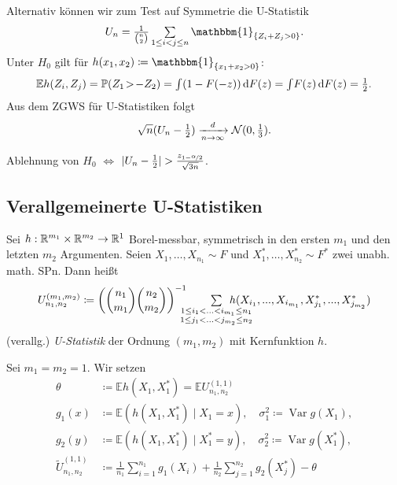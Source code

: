 \documentclass{cheat-sheet}
\renewcommand{\P}{\mathbb{P}} %
\newcommand{\E}{\mathbb{E}} %
\newcommand{\ind}{\mathbbm{1}} %
\DeclareMathOperator{\var}{Var} %
\newcommand{\Normal}{\mathcal{N}} %
\begin{document}
\begin{bsp}
  Alternativ können wir zum Test auf Symmetrie die U-Statistik
  \[
    U_n = \tfrac{1}{\binom{n}{2}} \sum_{1 \leq i < j \leq n} \ind_{\{ Z_i + Z_j > 0 \}}.
  \]
  Unter $H_0$ gilt für $h(x_1, x_2) \coloneqq \ind_{\{ x_1 + x_2 > 0 \}}$:
  \[
    \E h(Z_i, Z_j)
    = \P(Z_1 \!>\! - Z_2)
    = \IInt{(1 - F(-z))}{F(z)}
    = \IInt{F(z)}{F(z)}
    = \tfrac{1}{2}.
  \]
  Aus dem ZGWS für U-Statistiken folgt
  \[
    \sqrt{n} (U_n - \tfrac{1}{2}) \xra[n \to \infty]{d} \Normal(0, \tfrac{1}{3}).
  \]
\end{bsp}

\begin{entscheidungsregel}
  Ablehnung von $H_0$ $\iff$
  $\lvert U_n - \tfrac{1}{2}\rvert > \tfrac{z_{1 - \nicefrac{\alpha}{2}}}{\sqrt{3n}}$.
\end{entscheidungsregel}

\subsection{Verallgemeinerte U-Statistiken}



\begin{defn}
  Sei $h : \mathbb{R}^{m_1} \times \mathbb{R}^{m_2} \to \mathbb{R}^1$ Borel-messbar, symmetrisch in den ersten $m_1$ und den letzten $m_2$ Argumenten.
  Seien $X_1, \ldots, X_{n_1} \sim F$ und $X_1^*, \ldots, X_{n_2}^* \sim F^*$ zwei unabh. math. SPn.
  Dann heißt
  \[
    U_{n_1, n_2}^{(m_1, m_2)} \coloneqq \left( \binom{n_1}{m_1} \binom{n_2}{m_2} \right)^{-1} \qquad
    \sum_{\mathclap{\substack{1 \leq i_1 < \ldots < i_{m_1} \leq n_1 \\ 1 \leq j_1 < \ldots < j_{m_2} \leq n_2}}} \enspace
    h(X_{i_1}, \nldots, X_{i_{m_1}}, X_{j_1}^*, \nldots, X_{j_{m_2}}^*)
  \]
  (verallg.) \emph{U-Statistik} der Ordnung $(m_1, m_2)$ mit Kernfunktion $h$.
\end{defn}

\begin{nota}
  Sei $m_1 = m_2 = 1$.
  Wir setzen
  \begin{align*}
    \theta & \coloneqq \E h(X_1, X_1^*) = \E U_{n_1, n_2}^{(1, 1)} \\
    g_1(x) & \coloneqq \E( h(X_1, X_1^*) \mid X_1 = x), \quad
    \sigma_1^2 \coloneqq \var g(X_1), \\
    g_2(y) & \coloneqq \E( h(X_1, X_1^*) \mid X_1^* = y), \quad
    \sigma_2^2 \coloneqq \var g(X_1^*), \\
    \tilde{U}_{n_1, n_2}^{(1,1)} & \coloneqq \tfrac{1}{n_1} \sum_{i=1}^{n_1} g_1(X_i) + \tfrac{1}{n_2} \sum_{j=1}^{n_2} g_2(X_j^*) - \theta
  \end{align*}
\end{nota}
\end{document}
